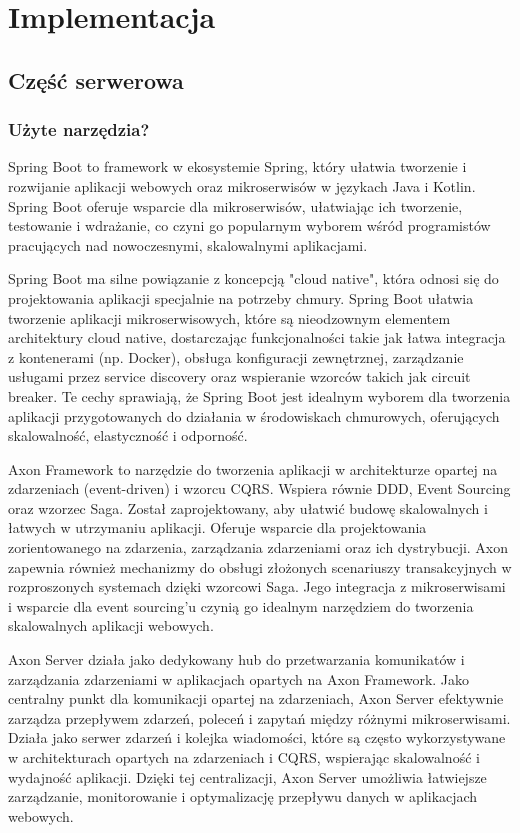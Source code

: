 \clearpage %

\section{Implementacja}

\subsection{Część serwerowa}

\subsubsection{Użyte narzędzia?}

Spring Boot to framework w ekosystemie Spring, który ułatwia tworzenie i rozwijanie aplikacji webowych oraz mikroserwisów w językach Java i Kotlin. Spring Boot oferuje wsparcie dla mikroserwisów, ułatwiając ich tworzenie, testowanie i wdrażanie, co czyni go popularnym wyborem wśród programistów pracujących nad nowoczesnymi, skalowalnymi aplikacjami.

Spring Boot ma silne powiązanie z koncepcją "cloud native", która odnosi się do projektowania aplikacji specjalnie na potrzeby chmury. Spring Boot ułatwia tworzenie aplikacji mikroserwisowych, które są nieodzownym elementem architektury cloud native, dostarczając funkcjonalności takie jak łatwa integracja z kontenerami (np. Docker), obsługa konfiguracji zewnętrznej, zarządzanie usługami przez service discovery oraz wspieranie wzorców takich jak circuit breaker. Te cechy sprawiają, że Spring Boot jest idealnym wyborem dla tworzenia aplikacji przygotowanych do działania w środowiskach chmurowych, oferujących skalowalność, elastyczność i odporność.

Axon Framework to narzędzie do tworzenia aplikacji w architekturze opartej na zdarzeniach (event-driven) i wzorcu CQRS. Wspiera równie DDD, Event Sourcing oraz wzorzec Saga. Został zaprojektowany, aby ułatwić budowę skalowalnych i łatwych w utrzymaniu aplikacji. Oferuje wsparcie dla projektowania zorientowanego na zdarzenia, zarządzania zdarzeniami oraz ich dystrybucji. Axon zapewnia również mechanizmy do obsługi złożonych scenariuszy transakcyjnych w rozproszonych systemach dzięki wzorcowi Saga. Jego integracja z mikroserwisami i wsparcie dla event sourcing'u czynią go idealnym narzędziem do tworzenia skalowalnych aplikacji webowych.

Axon Server działa jako dedykowany hub do przetwarzania komunikatów i zarządzania zdarzeniami w aplikacjach opartych na Axon Framework. Jako centralny punkt dla komunikacji opartej na zdarzeniach, Axon Server efektywnie zarządza przepływem zdarzeń, poleceń i zapytań między różnymi mikroserwisami. Działa jako serwer zdarzeń i kolejka wiadomości, które są często wykorzystywane w architekturach opartych na zdarzeniach i CQRS, wspierając skalowalność i wydajność aplikacji. Dzięki tej centralizacji, Axon Server umożliwia łatwiejsze zarządzanie, monitorowanie i optymalizację przepływu danych w aplikacjach webowych.

